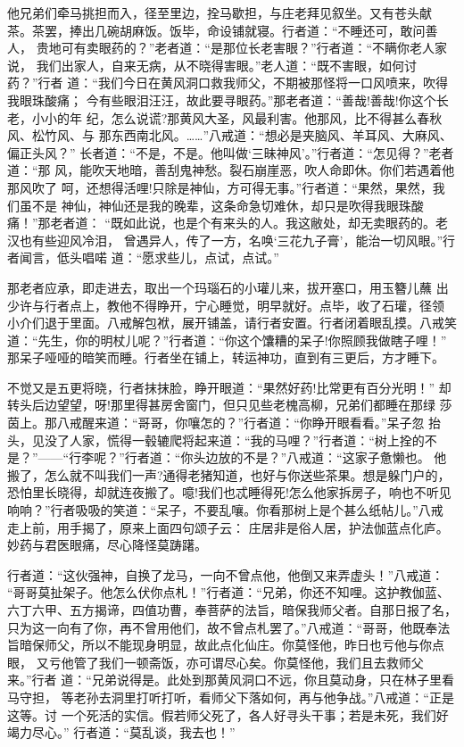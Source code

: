 他兄弟们牵马挑担而入，径至里边，拴马歇担，与庄老拜见叙坐。又有苍头献
茶。茶罢，捧出几碗胡麻饭。饭毕，命设铺就寝。行者道：“不睡还可，敢问善人，
贵地可有卖眼药的？”老者道：“是那位长老害眼？”行者道：“不瞒你老人家说，
我们出家人，自来无病，从不晓得害眼。”老人道：“既不害眼，如何讨药？”行者
道：“我们今日在黄风洞口救我师父，不期被那怪将一口风喷来，吹得我眼珠酸痛；
今有些眼泪汪汪，故此要寻眼药。”那老者道：“善哉!善哉!你这个长老，小小的年
纪，怎么说谎?那黄风大圣，风最利害。他那风，比不得甚么春秋风、松竹风、与
那东西南北风。……”八戒道：“想必是夹脑风、羊耳风、大麻风、偏正头风？”
长者道：“不是，不是。他叫做‘三昧神风’。”行者道：“怎见得？”老者道：“那
风，能吹天地暗，善刮鬼神愁。裂石崩崖恶，吹人命即休。你们若遇着他那风吹了
呵，还想得活哩!只除是神仙，方可得无事。”行者道：“果然，果然，我们虽不是
神仙，神仙还是我的晚辈，这条命急切难休，却只是吹得我眼珠酸痛！”那老者道：
“既如此说，也是个有来头的人。我这敝处，却无卖眼药的。老汉也有些迎风冷泪，
曾遇异人，传了一方，名唤‘三花九子膏’，能治一切风眼。”行者闻言，低头唱喏
道：“愿求些儿，点试，点试。”

那老者应承，即走进去，取出一个玛瑙石的小瓘儿来，拔开塞口，用玉簪儿蘸
出少许与行者点上，教他不得睁开，宁心睡觉，明早就好。点毕，收了石瓘，径领
小介们退于里面。八戒解包袱，展开铺盖，请行者安置。行者闭着眼乱摸。八戒笑
道：“先生，你的明杖儿呢？”行者道：“你这个馕糟的呆子!你照顾我做瞎子哩！”
那呆子哑哑的暗笑而睡。行者坐在铺上，转运神功，直到有三更后，方才睡下。

不觉又是五更将晓，行者抹抹脸，睁开眼道：“果然好药!比常更有百分光明！”
却转头后边望望，呀!那里得甚房舍窗门，但只见些老槐高柳，兄弟们都睡在那绿
莎茵上。那八戒醒来道：“哥哥，你嚷怎的？”行者道：“你睁开眼看看。”呆子忽
抬头，见没了人家，慌得一毂辘爬将起来道：“我的马哩？”行者道：“树上拴的不
是？”——“行李呢？”行者道：“你头边放的不是？”八戒道：“这家子惫懒也。
他搬了，怎么就不叫我们一声?通得老猪知道，也好与你送些茶果。想是躲门户的，
恐怕里长晓得，却就连夜搬了。噫!我们也忒睡得死!怎么他家拆房子，响也不听见
响响？”行者吸吸的笑道：“呆子，不要乱嚷。你看那树上是个甚么纸帖儿。”八戒
走上前，用手揭了，原来上面四句颂子云：
庄居非是俗人居，护法伽蓝点化庐。
妙药与君医眼痛，尽心降怪莫踌躇。

行者道：“这伙强神，自换了龙马，一向不曾点他，他倒又来弄虚头！”八戒道：
“哥哥莫扯架子。他怎么伏你点札！”行者道：“兄弟，你还不知哩。这护教伽蓝、
六丁六甲、五方揭谛，四值功曹，奉菩萨的法旨，暗保我师父者。自那日报了名，
只为这一向有了你，再不曾用他们，故不曾点札罢了。”八戒道：“哥哥，他既奉法
旨暗保师父，所以不能现身明显，故此点化仙庄。你莫怪他，昨日也亏他与你点眼，
又亏他管了我们一顿斋饭，亦可谓尽心矣。你莫怪他，我们且去救师父来。”行者
道：“兄弟说得是。此处到那黄风洞口不远，你且莫动身，只在林子里看马守担，
等老孙去洞里打听打听，看师父下落如何，再与他争战。”八戒道：“正是这等。讨
一个死活的实信。假若师父死了，各人好寻头干事；若是未死，我们好竭力尽心。”
行者道：“莫乱谈，我去也！”

